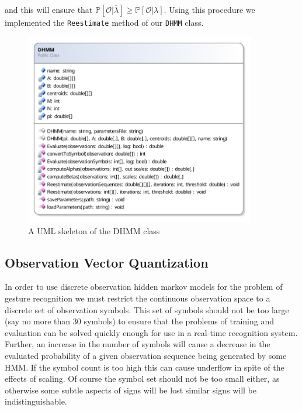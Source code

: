 and this will ensure that $\mathbb{P}[\mathcal{O}|\overline{\lambda}] \geq \mathbb{P}[\mathcal{O}|\lambda]$. Using this procedure we implemented the \verb|Reestimate| method of our \verb|DHMM| class.

\begin{figure}[h!]
        \centering
        \includegraphics[width=0.9\textwidth]{ThesisFigs/DHMMDiag}
        \caption{A UML skeleton of the DHMM class}\label{fig:dhmmdiag}
\end{figure}

\subsection{Observation Vector Quantization}
In order to use discrete observation hidden markov models for the problem of gesture recognition we must restrict the continuous observation space to a discrete set of observation symbols. This set of symbols should not be too large (say no more than 30 symbols) to ensure that the problems of training and evaluation can be solved quickly enough for use in a real-time recognition system. Further, an increase in the number of symbols will cause a decrease in the evaluated probability of a given observation sequence being generated by some HMM. If the symbol count is too high this can cause underflow in spite of the effects of scaling. Of course the symbol set should not be too small either, as otherwise some subtle aspects of signs will be lost similar signs will be indistinguishable.

